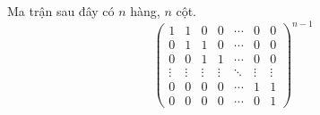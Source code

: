 \documentclass[class=linearalgebra,crop=false]{standalone}
\begin{document}
\begin{exercise}
    Ma trận sau đây có $n$ hàng, $n$ cột.
    \[
        \begin{pmatrix}
            1      & 1      & 0      & 0      & \cdots & 0      & 0      \\
            0      & 1      & 1      & 0      & \cdots & 0      & 0      \\
            0      & 0      & 1      & 1      & \cdots & 0      & 0      \\
            \vdots & \vdots & \vdots & \vdots & \ddots & \vdots & \vdots \\
            0      & 0      & 0      & 0      & \cdots & 1      & 1      \\
            0      & 0      & 0      & 0      & \cdots & 0      & 1
        \end{pmatrix}^{n-1}
    \]
\end{exercise}
\end{document}
